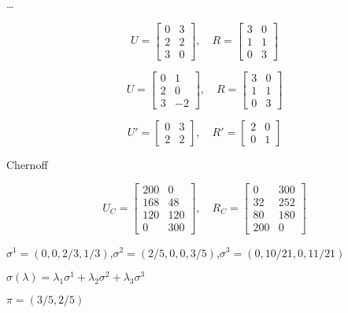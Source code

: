 \documentclass{article}
\begin{document}
\dots


\iffalse

\[
U =
\begin{bmatrix}
    0 & 3 \\
    2 & 2 \\
    3 & 0
\end{bmatrix}
, \quad
R =
\begin{bmatrix}
    3 & 0 \\
    1 & 1 \\
    0 & 3
\end{bmatrix}
\]

\[
U =
\begin{bmatrix}
    0 & 1 \\
    2 & 0 \\
    3 & -2
\end{bmatrix}
, \quad
R =
\begin{bmatrix}
    3 & 0 \\
    1 & 1 \\
    0 & 3
\end{bmatrix}
\]

\[
U' =
\begin{bmatrix}
    0 & 3 \\
    2 & 2 
\end{bmatrix}
, \quad
R' =
\begin{bmatrix}
    2 & 0 \\
    0 & 1 
\end{bmatrix}
\]

Chernoff

\[
U_C =
\begin{bmatrix}
    200 & 0 \\
    168 & 48 \\
    120 & 120 \\
    0 & 300
\end{bmatrix}
, \quad
R_C =
\begin{bmatrix}
    0 & 300 \\
    32 & 252 \\
    80 & 180 \\
    200 & 0
\end{bmatrix}
\]

$\sigma^1=(0,0,2/3,1/3)$,$\sigma^2=(2/5,0,0,3/5)$,$\sigma^3=(0,10/21,0,11/21)$

$\sigma(\lambda)=\lambda_1 \sigma^1 + \lambda_2 \sigma^2 + \lambda_3 \sigma^3$

$\pi=(3/5,2/5)$
\end{document}
